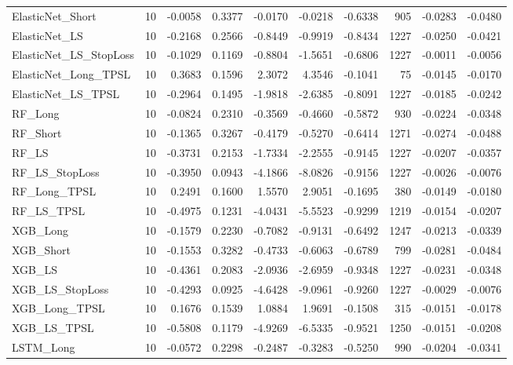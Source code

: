 \begin{tabular}{llrrrrrrrr}
\cline{1-10}
ElasticNet\_Short & 10 & -0.0058 & 0.3377 & -0.0170 & -0.0218 & -0.6338 & 905 & -0.0283 & -0.0480 \\
\cline{1-10}
ElasticNet\_LS & 10 & -0.2168 & 0.2566 & -0.8449 & -0.9919 & -0.8434 & 1227 & -0.0250 & -0.0421 \\
\cline{1-10}
ElasticNet\_LS\_StopLoss & 10 & -0.1029 & 0.1169 & -0.8804 & -1.5651 & -0.6806 & 1227 & -0.0011 & -0.0056 \\
\cline{1-10}
ElasticNet\_Long\_TPSL & 10 & 0.3683 & 0.1596 & 2.3072 & 4.3546 & -0.1041 & 75 & -0.0145 & -0.0170 \\
\cline{1-10}
ElasticNet\_LS\_TPSL & 10 & -0.2964 & 0.1495 & -1.9818 & -2.6385 & -0.8091 & 1227 & -0.0185 & -0.0242 \\
\cline{1-10}
RF\_Long & 10 & -0.0824 & 0.2310 & -0.3569 & -0.4660 & -0.5872 & 930 & -0.0224 & -0.0348 \\
\cline{1-10}
RF\_Short & 10 & -0.1365 & 0.3267 & -0.4179 & -0.5270 & -0.6414 & 1271 & -0.0274 & -0.0488 \\
\cline{1-10}
RF\_LS & 10 & -0.3731 & 0.2153 & -1.7334 & -2.2555 & -0.9145 & 1227 & -0.0207 & -0.0357 \\
\cline{1-10}
RF\_LS\_StopLoss & 10 & -0.3950 & 0.0943 & -4.1866 & -8.0826 & -0.9156 & 1227 & -0.0026 & -0.0076 \\
\cline{1-10}
RF\_Long\_TPSL & 10 & 0.2491 & 0.1600 & 1.5570 & 2.9051 & -0.1695 & 380 & -0.0149 & -0.0180 \\
\cline{1-10}
RF\_LS\_TPSL & 10 & -0.4975 & 0.1231 & -4.0431 & -5.5523 & -0.9299 & 1219 & -0.0154 & -0.0207 \\
\cline{1-10}
XGB\_Long & 10 & -0.1579 & 0.2230 & -0.7082 & -0.9131 & -0.6492 & 1247 & -0.0213 & -0.0339 \\
\cline{1-10}
XGB\_Short & 10 & -0.1553 & 0.3282 & -0.4733 & -0.6063 & -0.6789 & 799 & -0.0281 & -0.0484 \\
\cline{1-10}
XGB\_LS & 10 & -0.4361 & 0.2083 & -2.0936 & -2.6959 & -0.9348 & 1227 & -0.0231 & -0.0348 \\
\cline{1-10}
XGB\_LS\_StopLoss & 10 & -0.4293 & 0.0925 & -4.6428 & -9.0961 & -0.9260 & 1227 & -0.0029 & -0.0076 \\
\cline{1-10}
XGB\_Long\_TPSL & 10 & 0.1676 & 0.1539 & 1.0884 & 1.9691 & -0.1508 & 315 & -0.0151 & -0.0178 \\
\cline{1-10}
XGB\_LS\_TPSL & 10 & -0.5808 & 0.1179 & -4.9269 & -6.5335 & -0.9521 & 1250 & -0.0151 & -0.0208 \\
\cline{1-10}
LSTM\_Long & 10 & -0.0572 & 0.2298 & -0.2487 & -0.3283 & -0.5250 & 990 & -0.0204 & -0.0341 \\

\end{tabular}
